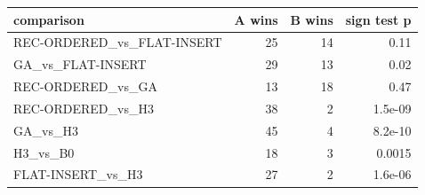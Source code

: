 \begin{tabular}{lrrr}
\toprule
comparison & A wins & B wins & sign test p \\
\midrule
REC-ORDERED\_vs\_FLAT-INSERT & 25 & 14 & 0.11 \\
GA\_vs\_FLAT-INSERT & 29 & 13 & 0.02 \\
REC-ORDERED\_vs\_GA & 13 & 18 & 0.47 \\
REC-ORDERED\_vs\_H3 & 38 & 2 & 1.5e-09 \\
GA\_vs\_H3 & 45 & 4 & 8.2e-10 \\
H3\_vs\_B0 & 18 & 3 & 0.0015 \\
FLAT-INSERT\_vs\_H3 & 27 & 2 & 1.6e-06 \\
\bottomrule
\end{tabular}
